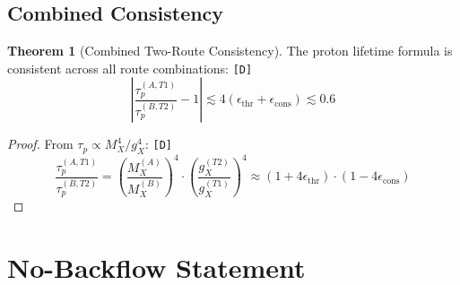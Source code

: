 \documentclass[11pt,a4paper]{article}
\newcommand{\tagD}{\textcolor{green!50!black}{\texttt{[D]}}}
\theoremstyle{definition}
\newtheorem{theorem}{Theorem}[section]
\begin{document}
\subsection{Combined Consistency}
\label{subsec:combined-consistency}

\begin{theorem}[Combined Two-Route Consistency]
\label{thm:combined}
The proton lifetime formula is consistent across all route combinations: \tagD{}
\begin{equation}
\label{eq:combined-consistency}
\left|\frac{\tau_p^{(A,T1)}}{\tau_p^{(B,T2)}} - 1\right| \lesssim 4(\epsilon_{\text{thr}} + \epsilon_{\text{cons}}) \lesssim 0.6
\end{equation}
\end{theorem}

\begin{proof}
From $\tau_p \propto M_X^4/g_X^4$: \tagD{}
\begin{equation}
\label{eq:combined-proof}
\frac{\tau_p^{(A,T1)}}{\tau_p^{(B,T2)}} = \left(\frac{M_X^{(A)}}{M_X^{(B)}}\right)^4 \cdot \left(\frac{g_X^{(T2)}}{g_X^{(T1)}}\right)^4
\approx (1 + 4\epsilon_{\text{thr}}) \cdot (1 - 4\epsilon_{\text{cons}})
\end{equation}
\end{proof}

\section{No-Backflow Statement}
\label{sec:no-backflow}
\end{document}
